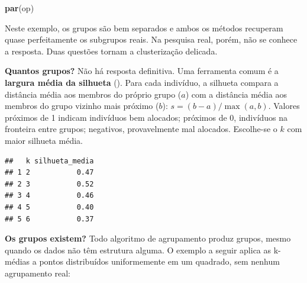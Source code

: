 \documentclass[
]{book}
\newenvironment{Shaded}{\begin{snugshade}}{\end{snugshade}}
\newcommand{\AttributeTok}[1]{\textcolor[rgb]{0.13,0.29,0.53}{#1}}
\newcommand{\ControlFlowTok}[1]{\textcolor[rgb]{0.13,0.29,0.53}{\textbf{#1}}}
\newcommand{\DecValTok}[1]{\textcolor[rgb]{0.00,0.00,0.81}{#1}}
\newcommand{\FunctionTok}[1]{\textcolor[rgb]{0.13,0.29,0.53}{\textbf{#1}}}
\newcommand{\NormalTok}[1]{#1}
\newcommand{\OtherTok}[1]{\textcolor[rgb]{0.56,0.35,0.01}{#1}}
\newcommand{\SpecialCharTok}[1]{\textcolor[rgb]{0.81,0.36,0.00}{\textbf{#1}}}
\newcommand{\StringTok}[1]{\textcolor[rgb]{0.31,0.60,0.02}{#1}}
\begin{document}
\begin{Shaded}
\begin{Highlighting}[]
\FunctionTok{par}\NormalTok{(op)}
\end{Highlighting}
\end{Shaded}

Neste exemplo, os grupos são bem separados e ambos os métodos recuperam quase perfeitamente os subgrupos reais. Na pesquisa real, porém, não se conhece a resposta. Duas questões tornam a clusterização delicada.

\textbf{Quantos grupos?} Não há resposta definitiva. Uma ferramenta comum é a \textbf{largura média da silhueta} (). Para cada indivíduo, a silhueta compara a distância média aos membros do próprio grupo (\(a\)) com a distância média aos membros do grupo vizinho mais próximo (\(b\)): \(s = (b - a)/\max(a, b)\). Valores próximos de 1 indicam indivíduos bem alocados; próximos de 0, indivíduos na fronteira entre grupos; negativos, provavelmente mal alocados. Escolhe-se o \(k\) com maior silhueta média.

\begin{Shaded}
\end{Shaded}

\begin{verbatim}
##   k silhueta_media
## 1 2           0.47
## 2 3           0.52
## 3 4           0.46
## 4 5           0.40
## 5 6           0.37
\end{verbatim}

\textbf{Os grupos existem?} Todo algoritmo de agrupamento produz grupos, mesmo quando os dados não têm estrutura alguma. O exemplo a seguir aplica as k-médias a pontos distribuídos uniformemente em um quadrado, sem nenhum agrupamento real:
\end{document}
